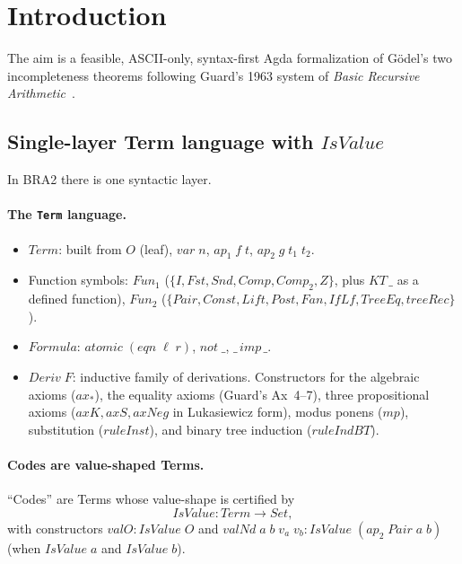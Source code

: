 \documentclass[11pt]{article}
\begin{document}
\section{Introduction}

The aim is a feasible, ASCII-only, syntax-first Agda formalization of
G\"odel's two incompleteness theorems following Guard's 1963 system of
\emph{Basic Recursive Arithmetic}~\cite{guard1963}.

\subsection{Single-layer Term language with $\mathit{IsValue}$}
\label{subsec:layers}

In BRA2 there is one syntactic layer.

\paragraph{The \texttt{Term} language.}
\begin{itemize}
  \item $\mathit{Term}$: built from $O$ (leaf), $\mathit{var}\;n$,
        $\mathit{ap}_1\;f\;t$, $\mathit{ap}_2\;g\;t_1\;t_2$.
  \item Function symbols: $\mathit{Fun}_1$
        ($\{I, \mathit{Fst}, \mathit{Snd}, \mathit{Comp}, \mathit{Comp}_2, Z\}$,
        plus $\mathit{KT}\,\_$ as a defined function), $\mathit{Fun}_2$
        ($\{\mathit{Pair}, \mathit{Const}, \mathit{Lift}, \mathit{Post}, \mathit{Fan}, \mathit{IfLf}, \mathit{TreeEq}, \mathit{treeRec}\}$).
  \item $\mathit{Formula}$: $\mathit{atomic}\;(\mathit{eqn}\;\ell\;r)$, $\mathit{not}\;\_$, $\_\,\mathit{imp}\,\_$.
  \item $\mathit{Deriv}\;F$: inductive family of derivations.  Constructors
        for the algebraic axioms ($\mathit{ax}_*$), the equality axioms
        (Guard's Ax~4--7), three propositional axioms ($\mathit{axK}, \mathit{axS}, \mathit{axNeg}$
        in Lukasiewicz form), modus ponens ($\mathit{mp}$), substitution
        ($\mathit{ruleInst}$), and binary tree induction ($\mathit{ruleIndBT}$).
\end{itemize}

\paragraph{Codes are value-shaped Terms.}
``Codes'' are Terms whose value-shape is certified by
\[
  \mathit{IsValue} : \mathit{Term} \to \mathit{Set},
\]
with constructors
$\mathit{valO} : \mathit{IsValue}\;O$ and
$\mathit{valNd}\;a\;b\;v_a\;v_b : \mathit{IsValue}\;(\mathit{ap}_2\;\mathit{Pair}\;a\;b)$
(when $\mathit{IsValue}\;a$ and $\mathit{IsValue}\;b$).
\end{document}
